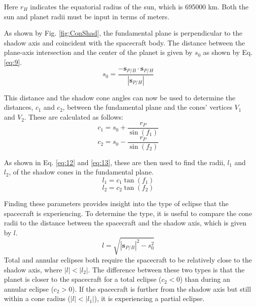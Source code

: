 Here $r_H$ indicates the equatorial radius of the sun, which is 695000 km. Both the sun and planet radii must be input in terms of meters.

As shown by Fig. \ref{fig:ConShad}, the fundamental plane is perpendicular to the shadow axis and coincident with the spacecraft body. The distance between the plane-axis intersection and the center of the planet is given by $s_0$ as shown by Eq. \ref{eq:9}.
\begin{equation} \label{eq:9}
s_0 = \frac{-\bm{s}_{P/B} \cdot \bm{s}_{P/H}}{|\bm{s}_{P/H}|} 
\end{equation}

This distance and the shadow cone angles can now be used to determine the distances, $c_1$ and $c_2$, between the fundamental plane and the cones' vertices $V_1$ and $V_2$. These are calculated as follows:
\begin{equation} \label{eq:10}
c_1 = s_0 + \frac{r_P}{\sin(f_1)}
\end{equation}
\begin{equation} \label{eq:11}
c_2 = s_0 - \frac{r_P}{\sin(f_2)}
\end{equation}

As shown in Eq. \ref{eq:12} and \ref{eq:13}, these are then used to find the radii, $l_1$ and $l_2$, of the shadow cones in the fundamental plane.
\begin{equation} \label{eq:12}
l_1 = c_1 \tan(f_1)
\end{equation}
\begin{equation} \label{eq:13}
l_2 = c_2 \tan(f_2)
\end{equation}

Finding these parameters provides insight into the type of eclipse that the spacecraft is experiencing. To determine the type, it is useful to compare the cone radii to the distance between the spacecraft and the shadow axis, which is given by $l$.
\begin{equation}\label{eq:14}
l = \sqrt{|\bm{s}_{P/B}|^2 - s^2_0}
\end{equation}
Total and annular eclipses both require the spacecraft to be relatively close to the shadow axis, where $|l|<|l_2|$. The difference between these two types is that the planet is closer to the spacecraft for a total eclipse ($c_2 < 0$) than during an annular eclipse ($c_2 > 0$). If the spacecraft is further from the shadow axis but still within a cone radius ($|l|<|l_1|$), it is experiencing a partial eclipse.

